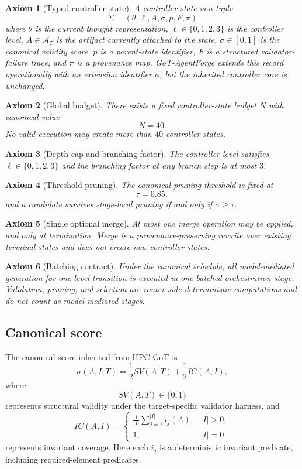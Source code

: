 \documentclass[11pt,a4paper,oneside]{article}
\newtheorem{axiom}{Axiom}[section]
\begin{document}
\begin{axiom}[Typed controller state]
A controller state is a tuple
\[
\Sigma = (\theta,\ell,A,\sigma,p,F,\pi)
\]
where $\theta$ is the current thought representation, $\ell \in \{0,1,2,3\}$ is the controller level, $A \in \mathcal{A}_T$ is the artifact currently attached to the state, $\sigma \in [0,1]$ is the canonical validity score, $p$ is a parent-state identifier, $F$ is a structured validator-failure trace, and $\pi$ is a provenance map. GoT-AgentForge extends this record operationally with an extension identifier $\phi$, but the inherited controller core is unchanged.
\end{axiom}

\begin{axiom}[Global budget]
There exists a fixed controller-state budget $N$ with canonical value
\[
N=40.
\]
No valid execution may create more than $40$ controller states.
\end{axiom}

\begin{axiom}[Depth cap and branching factor]
The controller level satisfies $\ell \in \{0,1,2,3\}$ and the branching factor at any branch step is at most $3$.
\end{axiom}

\begin{axiom}[Threshold pruning]
The canonical pruning threshold is fixed at
\[
\tau = 0.85,
\]
and a candidate survives stage-local pruning if and only if $\sigma \ge \tau$.
\end{axiom}

\begin{axiom}[Single optional merge]
At most one merge operation may be applied, and only at termination. Merge is a provenance-preserving rewrite over existing terminal states and does not create new controller states.
\end{axiom}

\begin{axiom}[Batching contract]
Under the canonical schedule, all model-mediated generation for one level transition is executed in one batched orchestration stage. Validation, pruning, and selection are router-side deterministic computations and do not count as model-mediated stages.
\end{axiom}

\subsection{Canonical score}
The canonical score inherited from HPC-GoT is
\[
\sigma(A,I,T)=\frac{1}{2}SV(A,T)+\frac{1}{2}IC(A,I),
\]
where
\[
SV(A,T) \in \{0,1\}
\]
represents structural validity under the target-specific validator harness, and
\[
IC(A,I)=
\begin{cases}
\frac{1}{|I|}\sum_{j=1}^{|I|} i_j(A), & |I|>0,\\
1, & |I|=0
\end{cases}
\]
represents invariant coverage. Here each $i_j$ is a deterministic invariant predicate, including required-element predicates.
\end{document}
